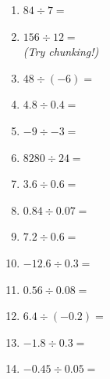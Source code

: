 \documentclass[12pt,a4paper]{article}
\begin{document}
\begin{center}
\begin{minipage}[t]{0.3\textwidth}
\vspace{0.5em}
\begin{enumerate}
    \item $84 \div 7 =$ \vspace{1em}
    \item $156 \div 12 =$ \\[0.3em]
    \textit{(Try chunking!)} \vspace{1em}
    \item $48 \div (-6) =$ \vspace{1em}
    \item $4.8 \div 0.4 =$ \vspace{1em}
\end{enumerate}
\end{minipage}
\hfill
\begin{minipage}[t]{0.3\textwidth}  
\begin{enumerate}\setcounter{enumi}{4}
    \item $-9 \div -3 =$ \vspace{1em}
    \item $8280 \div 24 =$ \vspace{1em}
    \item $3.6 \div 0.6 =$ \vspace{1em}
    \item $0.84 \div 0.07 =$ \vspace{1em}
    \item $7.2 \div 0.6 =$
\end{enumerate}
\end{minipage}
\hfill
\begin{minipage}[t]{0.3\textwidth}
\begin{enumerate}\setcounter{enumi}{9}
    \item $-12.6 \div 0.3 =$ \vspace{1em}
    \item $0.56 \div 0.08 =$ \vspace{1em}
    \item $6.4 \div (-0.2) =$ \vspace{1em}
    \item $-1.8 \div 0.3 =$ \vspace{1em}
    \item $-0.45 \div 0.05 =$
\end{enumerate}
\end{minipage}
\end{center}
\end{document}
